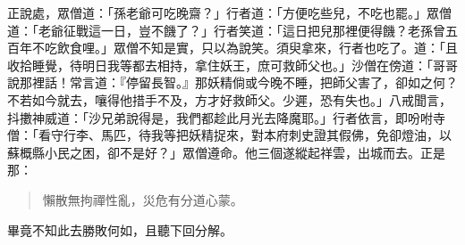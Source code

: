 正說處，眾僧道：「孫老爺可吃晚齋？」行者道：「方便吃些兒，不吃也罷。」眾僧道：「老爺征戰這一日，豈不饑了？」行者笑道：「這日把兒那裡便得饑？老孫曾五百年不吃飲食哩。」眾僧不知是實，只以為說笑。須臾拿來，行者也吃了。道：「且收拾睡覺，待明日我等都去相持，拿住妖王，庶可救師父也。」沙僧在傍道：「哥哥說那裡話！常言道：『停留長智。』那妖精倘或今晚不睡，把師父害了，卻如之何？不若如今就去，嚷得他措手不及，方才好救師父。少遲，恐有失也。」八戒聞言，抖擻神威道：「沙兄弟說得是，我們都趁此月光去降魔耶。」行者依言，即吩咐寺僧：「看守行李、馬匹，待我等把妖精捉來，對本府刺史證其假佛，免卻燈油，以蘇概縣小民之困，卻不是好？」眾僧遵命。他三個遂縱起祥雲，出城而去。正是那：
\begin{quote}
懶散無拘禪性亂，災危有分道心蒙。
\end{quote}

畢竟不知此去勝敗何如，且聽下回分解。
